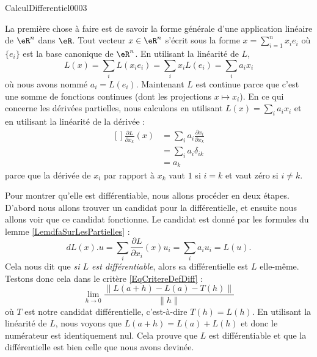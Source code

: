 \begin{corrige}{CalculDifferentiel0003}

	La première chose à faire est de savoir la forme générale d'une application linéaire de $\eR^n$ dans $\eR$. Tout vecteur $x\in\eR^n$ s'écrit sous la forme $x=\sum_{i=1}^nx_ie_i$ où $\{ e_i\}$ est la base canonique de $\eR^n$. En utilisant la linéarité de $L$,
	\begin{equation}
		L(x)=\sum_i L(x_ie_i)=\sum_ix_iL(e_i)=\sum_i a_ix_i
	\end{equation}
	où nous avons nommé $a_i=L(e_i)$. Maintenant $L$ est continue parce que c'est une somme de fonctions continues (dont les projections $x\mapsto x_i$). En ce qui concerne les dérivées partielles, nous calculons en utilisant $L(x)=\sum_ia_ix_i$ et en utilisant la linéarité de la dérivée :
	\begin{equation}
		\begin{aligned}[]
			\frac{ \partial L }{ \partial x_k }(x)&=\sum_ia_i\frac{ \partial x_i }{ \partial x_k }\\
			&=\sum_ia_i\delta_{ik}\\
			&=a_k
		\end{aligned}
	\end{equation}
	parce que la dérivée de $x_i$ par rapport à $x_k$ vaut $1$ si $i=k$ et vaut zéro si $i\neq k$.

	Pour montrer qu'elle est différentiable, nous allons procéder en deux étapes. D'abord nous allons trouver un candidat pour la différentielle, et ensuite nous allons voir que ce candidat fonctionne. Le candidat est donné par les formules du lemme \ref{LemdfaSurLesPartielles} :
	\begin{equation}
		dL(x).u=\sum_i\frac{ \partial L }{ \partial x_i }(x)u_i=\sum_ia_iu_i=L(u).
	\end{equation}
	Cela nous dit que \emph{si $L$ est différentiable}, alors sa différentielle est $L$ elle-même. Testons donc cela dans le critère \eqref{EqCritereDefDiff} :
	\begin{equation}
		\lim_{h\to 0} \frac{ \| L(a+h)-L(a)-T(h) \| }{ \| h \| }
	\end{equation}
	où $T$ est notre candidat différentielle, c'est-à-dire $T(h)=L(h)$. En utilisant la linéarité de $L$, nous voyons que $L(a+h)=L(a)+L(h)$ et donc le numérateur est identiquement nul. Cela prouve que $L$ est différentiable et que la différentielle est bien celle que nous avons devinée.

\end{corrige}
